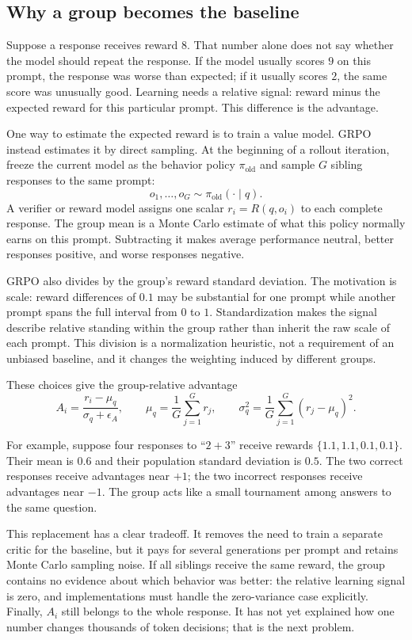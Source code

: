\subsection{Why a group becomes the baseline}
\label{subsec:grpo-group-advantage}

Suppose a response receives reward $8$. That number alone does not say whether the model
should repeat the response. If the model usually scores $9$ on this prompt, the response
was worse than expected; if it usually scores $2$, the same score was unusually good.
Learning needs a relative signal: reward minus the expected reward for this particular
prompt. This difference is the advantage.

One way to estimate the expected reward is to train a value model. GRPO instead estimates
it by direct sampling. At the beginning of a rollout iteration, freeze the current model
as the behavior policy $\pi_{\mathrm{old}}$ and sample $G$ sibling responses to the same
prompt:
\begin{equation}
  o_1,\ldots,o_G \sim \pi_{\mathrm{old}}(\cdot\mid q).
  \label{eq:grpo-grouped-rollouts}
\end{equation}
A verifier or reward model assigns one scalar $r_i=R(q,o_i)$ to each complete response.
The group mean is a Monte Carlo estimate of what this policy normally earns on this
prompt. Subtracting it makes average performance neutral, better responses positive, and
worse responses negative.

GRPO also divides by the group's reward standard deviation. The motivation is scale:
reward differences of $0.1$ may be substantial for one prompt while another prompt spans
the full interval from $0$ to $1$. Standardization makes the signal describe relative
standing within the group rather than inherit the raw scale of each prompt. This division
is a normalization heuristic, not a requirement of an unbiased baseline, and it changes
the weighting induced by different groups.

These choices give the group-relative advantage
\begin{equation}
  A_i
  = \frac{r_i-\mu_q}{\sigma_q+\epsilon_A},
  \qquad
  \mu_q=\frac{1}{G}\sum_{j=1}^{G}r_j,
  \qquad
  \sigma_q^2=\frac{1}{G}\sum_{j=1}^{G}(r_j-\mu_q)^2.
  \label{eq:grpo-group-advantage}
\end{equation}

For example, suppose four responses to ``$2+3$'' receive rewards
$\{1.1,1.1,0.1,0.1\}$. Their mean is $0.6$ and their population standard deviation is
$0.5$. The two correct responses receive advantages near $+1$; the two incorrect
responses receive advantages near $-1$. The group acts like a small tournament among
answers to the same question.

This replacement has a clear tradeoff. It removes the need to train a separate critic for
the baseline, but it pays for several generations per prompt and retains Monte Carlo
sampling noise. If all siblings receive the same reward, the group contains no evidence
about which behavior was better: the relative learning signal is zero, and implementations
must handle the zero-variance case explicitly. Finally, $A_i$ still belongs to the whole
response. It has not yet explained how one number changes thousands of token decisions;
that is the next problem.
